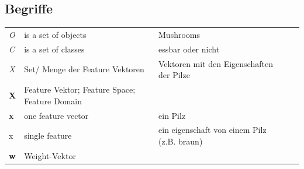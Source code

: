 \documentclass[11pt,a4paper]{article}
\author{Bianca}
\begin{document}
\begin{flushleft}
\section{Begriffe}
\begin{table}[]
\begin{tabular}{lllll}
\textit{O}                                                             & is a set of objects                                                                & Mushrooms                                                                                                            &  &  \\
\textit{C}                                                             & is a set of classes                                                                & essbar oder nicht                                                                                                    &  &  \\
\textit{X}                                                             & Set/ Menge der Feature Vektoren                                                    & Vektoren mit den Eigenschaften der Pilze                                                                             &  &  \\
\textbf{X}                                                             & Feature Vektor; Feature Space; Feature Domain                                      &                                                                                                                      &  &  \\
\textbf{x}                                                             & one feature vector                                                                 & ein Pilz                                                                                                             &  &  \\
x                                                                      & single feature                                                                     & ein eigenschaft von einem Pilz (z.B. braun)                                                                          &  &  \\
\textbf{w}                                                             & Weight-Vektor                                                                      &                                                                                                                      &  &  \\

\end{tabular}
\end{table}
\end{flushleft}
\end{document}
